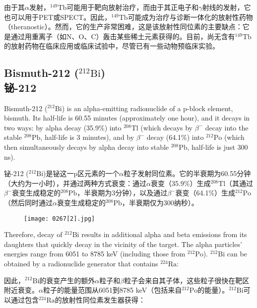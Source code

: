 \documentclass[dvipsnames, svgnames,a4paper,11pt]{article}
\begin{document}
由于其$\alpha$发射，\(\mathrm{^{149}Tb}\)可能用于靶向放射治疗，而由于其正电子和$\gamma$射线的发射，它也可以用于PET或SPECT。因此，\(\mathrm{^{149}Tb}\)可能成为治疗与诊断一体化的放射性药物（theranostic）。然而，它的生产非常困难，这是该放射性同位素的主要缺点：它是通过用重离子（如N、O、C）轰击某些稀土元素获得的。目前，尚无含有\(\mathrm{^{149}Tb}\)的放射药物在临床应用或临床试验中，尽管已有一些动物预临床实验。

\subsection{Bismuth-212 (\(\mathrm{^{212}Bi}\))\\铋-212}  
Bismuth-212 (\(\mathrm{^{212}Bi}\)) is an alpha-emitting radionuclide of a p-block element, bismuth. Its half-life is 60.55 minutes (approximately one hour), and it decays in two ways: by alpha decay (35.9\%) into \(\mathrm{^{208}Tl}\) (which decays by \(\beta^{-}\) decay into the stable \(\mathrm{^{208}Pb}\), half-life is 3 minutes), and by \(\beta^{-}\) decay (64.1\%) into \(\mathrm{^{212}Po}\) (which then simultaneously decays by alpha decay into stable \(\mathrm{^{208}Pb}\), half-life is just 300 ns).  

 
铋-212 (\(\mathrm{^{212}Bi}\))是铋这一p区元素的一个$\alpha$粒子发射同位素。它的半衰期为60.55分钟（大约为一小时），并通过两种方式衰变：通过$\alpha$衰变（35.9\%）生成\(\mathrm{^{208}Tl}\)（其通过\(\beta^{-}\)衰变生成稳定的\(\mathrm{^{208}Pb}\)，半衰期为3分钟），以及通过\(\beta^{-}\)衰变（64.1\%）生成\(\mathrm{^{212}Po}\)（然后同时通过$\alpha$衰变生成稳定的\(\mathrm{^{208}Pb}\)，半衰期仅为300纳秒）。  

\begin{figure}[h]
	\centering
    \texttt{[image: 0267[2].jpg]}  
     \label{fig357}
\end{figure}

Therefore, decay of \(\mathrm{^{212}Bi}\) results in additional alpha and beta emissions from its daughters that quickly decay in the vicinity of the target. The alpha particles' energies range from 6051 to 8785 keV (including those from \(\mathrm{^{212}Po}\)). \(\mathrm{^{212}Bi}\) can be obtained by a radionuclide generator that contains \(\mathrm{^{224}Ra}\):  

因此，\(\mathrm{^{212}Bi}\)的衰变产生的额外$\alpha$粒子和$\beta$粒子会来自其子体，这些粒子很快在靶区附近衰变。$\alpha$粒子的能量范围从6051到8785 keV（包括来自\(\mathrm{^{212}Po}\)的能量）。\(\mathrm{^{212}Bi}\)可以通过包含\(\mathrm{^{224}Ra}\)的放射性同位素发生器获得：  
\end{document}
